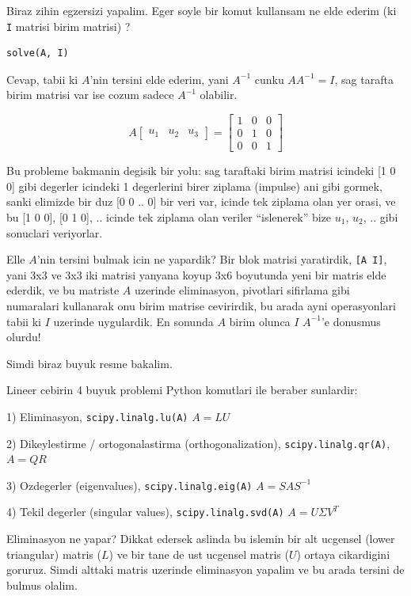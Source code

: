 \documentclass[12pt,fleqn]{article}\usepackage{../common}
\begin{document}
Biraz zihin egzersizi yapalim. Eger soyle bir komut kullansam ne elde
ederim (ki \verb!I! matrisi birim matrisi) ?

\begin{verbatim}
solve(A, I)
\end{verbatim}

Cevap, tabii ki $A$'nin tersini elde ederim, yani $A^{-1}$ cunku $AA^{-1} =
I$, 
sag tarafta birim matrisi var ise cozum sadece $A^{-1}$ olabilir.

\[ 
A 
\left[\begin{array}{rrr}
u_1 & u_2 & u_3
\end{array}\right]
=
\left[\begin{array}{rrr}
1 & 0 & 0\\
0 & 1 & 0\\
0 & 0 & 1
\end{array}\right]
 \]

Bu probleme bakmanin degisik bir yolu: sag taraftaki birim matrisi icindeki
[1 0 0] gibi degerler icindeki 1 degerlerini birer ziplama (impulse) ani
gibi gormek, sanki elimizde bir duz [0 0 .. 0] bir veri var, icinde tek
ziplama olan yer orasi, ve bu [1 0 0], [0 1 0], .. icinde tek ziplama olan
veriler ``islenerek'' bize $u_1$, $u_2$, .. gibi sonuclari veriyorlar. 

Elle $A$'nin tersini bulmak icin ne yapardik? Bir blok matrisi yaratirdik,
\verb![A I]!, yani 3x3 ve 3x3 iki matrisi yanyana koyup 3x6 boyutunda yeni
bir matris elde ederdik, ve bu matriste $A$ uzerinde eliminasyon, pivotlari
sifirlama gibi numaralari kullanarak onu birim matrise cevirirdik, bu arada
ayni operasyonlari tabii ki $I$ uzerinde uygulardik. En sonunda $A$ birim
olunca $I$ $A^{-1}$'e donusmus olurdu!

Simdi biraz buyuk resme bakalim. 

Lineer cebirin 4 buyuk problemi Python komutlari ile beraber sunlardir:

1) Eliminasyon, 
\verb!scipy.linalg.lu(A)! $A = LU$

2) Dikeylestirme / ortogonalastirma (orthogonalization), 
\verb!scipy.linalg.qr(A)!, $A = QR$

3) Ozdegerler (eigenvalues), 
\verb!scipy.linalg.eig(A)! $A = SAS^{-1}$

4) Tekil degerler (singular values), 
\verb!scipy.linalg.svd(A)! $A = U \Sigma V^{T}$

Eliminasyon ne yapar? Dikkat edersek aslinda bu islemin bir alt ucgensel
(lower triangular) matris ($L$) ve bir tane de ust ucgensel matris ($U$)
ortaya cikardigini goruruz. Simdi alttaki matris uzerinde eliminasyon
yapalim ve bu arada tersini de bulmus olalim. 
\end{document}
